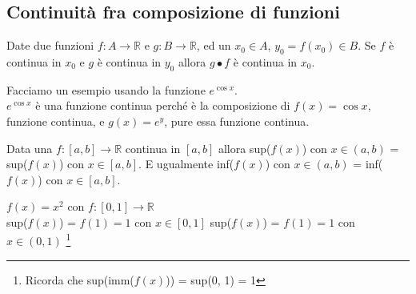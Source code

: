 \subsection{Continuità fra composizione di funzioni}
\begin{theorem}
    Date due funzioni $f: A \longrightarrow \mathbb{R}$ e $g: B \longrightarrow \mathbb{R}$, ed un $x_0 \in A$, $y_0 = f(x_0) \in B$.
    Se $f$ è continua in $x_0$ e $g$ è continua in $y_0$ allora $g \bullet f$ è continua in $x_0$.
\end{theorem}
\begin{example}
    Facciamo un esempio usando la funzione $e^{\cos{x}}$.\\
    $e^{\cos{x}}$ è una funzione continua perché è la composizione di $f(x) = \cos{x}$, funzione continua, e $g(x) = e^y$, pure essa funzione continua.
\end{example}
\begin{observation}
    Data una $f: [a, b] \longrightarrow \mathbb{R}$ continua in $[a, b]$ allora sup($f(x)$) con $x \in (a, b)$ = sup($f(x)$) con $x \in [a, b]$. E ugualmente inf($f(x)$) con $x \in (a, b)$ = inf($f(x)$) con $x \in [a, b]$.
\end{observation}
\begin{example}
    $f(x) = x^2$ con $f: [0,1] \longrightarrow \mathbb{R}$\\
    sup($f(x)$) = $f(1) = 1$ con $x \in [0, 1]$ \hspace{.5cm} sup($f(x)$) = $f(1) = 1$ con $x \in (0, 1)$ \footnote{Ricorda che sup(imm($f(x)$)) = sup(0, 1) = 1}
\end{example}


